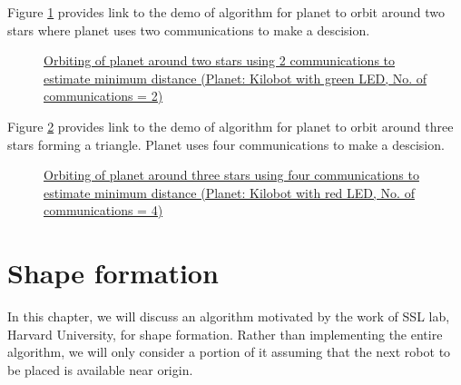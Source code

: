\documentclass{report}[12pt]
\begin{document}
Figure \ref{fig:orbit_two_star} provides link to the demo of algorithm for planet to orbit around two stars where planet uses two communications to make a descision.
\begin{figure}[H]
    \centering
    \caption{\href{https://youtu.be/EKvty2OxXxM}{Orbiting of planet around two stars using 2 communications to estimate minimum distance (Planet: Kilobot with green LED, No. of communications = 2)}}
    \label{fig:orbit_two_star}
\end{figure}

Figure \ref{fig:orbit_three_stars} provides link to the demo of algorithm for planet to orbit around three stars forming a triangle. Planet uses four communications to make a descision.
\begin{figure}[H]
    \centering
    \caption{\href{https://youtu.be/5aZm0Os9BPc}{Orbiting of planet around three stars using four communications to estimate minimum distance (Planet: Kilobot with red LED, No. of communications = 4)}}
    \label{fig:orbit_three_stars}
\end{figure}

\chapter{Shape formation}
In this chapter, we will discuss an algorithm motivated by the work \cite{MR-AC-RN:2014} of SSL lab, Harvard University, for shape formation. Rather than implementing the entire algorithm, we will only consider a portion of it assuming that the next robot to be placed is available near origin.
\end{document}
